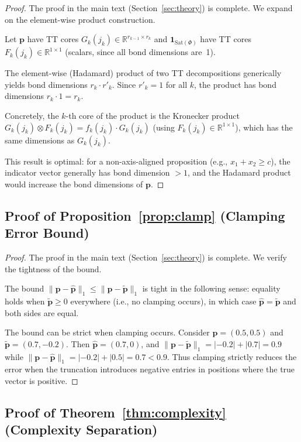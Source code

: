 \documentclass[11pt]{article}
\newcommand{\norm}[1]{\lVert #1 \rVert}
\newcommand{\R}{\mathbb{R}}
\newcommand{\Sat}{\mathrm{Sat}}
\begin{document}
\begin{proof}
The proof in the main text (Section~\ref{sec:theory}) is complete.
We expand on the element-wise product construction.

Let $\mathbf{p}$ have TT cores $G_k(j_k) \in \R^{r_{k-1}\times r_k}$
and $\mathbf{1}_{\Sat(\Phi)}$ have TT cores
$F_k(j_k) \in \R^{1 \times 1}$ (scalars, since all bond dimensions
are~1).

The element-wise (Hadamard) product of two TT decompositions
generically yields bond dimensions $r_k \cdot r'_k$.
Since $r'_k = 1$ for all $k$, the product has bond dimensions
$r_k \cdot 1 = r_k$.

Concretely, the $k$-th core of the product is the Kronecker product
$G_k(j_k) \otimes F_k(j_k) = f_k(j_k) \cdot G_k(j_k)$
(using $F_k(j_k) \in \R^{1\times 1}$),
which has the same dimensions as $G_k(j_k)$.

This result is optimal: for a non-axis-aligned proposition
(e.g., $x_1 + x_2 \geq c$), the indicator vector generally has
bond dimension $> 1$, and the Hadamard product would increase
the bond dimensions of $\mathbf{p}$.
\end{proof}

\subsection{Proof of Proposition~\ref{prop:clamp} (Clamping Error Bound)}

\begin{proof}
The proof in the main text (Section~\ref{sec:theory}) is complete.
We verify the tightness of the bound.

The bound $\norm{\mathbf{p} - \hat{\mathbf{p}}}_1 \leq
\norm{\mathbf{p} - \tilde{\mathbf{p}}}_1$ is tight in the
following sense: equality holds when $\tilde{\mathbf{p}} \geq 0$
everywhere (i.e., no clamping occurs), in which case
$\hat{\mathbf{p}} = \tilde{\mathbf{p}}$ and both sides are equal.

The bound can be strict when clamping occurs.
Consider $\mathbf{p} = (0.5, 0.5)$ and $\tilde{\mathbf{p}} = (0.7, -0.2)$.
Then $\hat{\mathbf{p}} = (0.7, 0)$, and
$\norm{\mathbf{p} - \tilde{\mathbf{p}}}_1 = |{-0.2}| + |0.7| = 0.9$
while $\norm{\mathbf{p} - \hat{\mathbf{p}}}_1 = |{-0.2}| + |0.5| = 0.7 < 0.9$.
Thus clamping strictly reduces the error when the truncation
introduces negative entries in positions where the true vector
is positive.
\end{proof}

\subsection{Proof of Theorem~\ref{thm:complexity} (Complexity Separation)}
\end{document}
